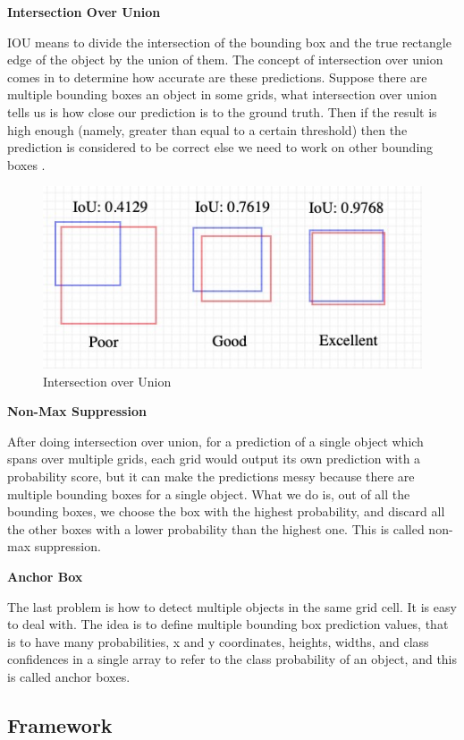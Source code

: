 \documentclass{article}
\begin{document}
\textbf{Intersection Over Union}

IOU means to divide the intersection of the bounding box and the true rectangle edge of the object by the union of them. The concept of intersection over union comes in to determine how accurate are these predictions. Suppose there are multiple bounding boxes an object in some grids, what intersection over union tells us is how close our prediction is to the ground truth. Then if the result is high enough (namely, greater than equal to a certain threshold) then the prediction is considered to be correct else we need to work on other bounding boxes \cite{ahmed2015optimizing}.

\begin{figure}[h]
\centering
\includegraphics[scale=0.5]{IoU.jpeg}
\caption{Intersection over Union}
\label{fig:IoU}
\end{figure}

\textbf{Non-Max Suppression}

After doing intersection over union, for a prediction of a single object which spans over multiple grids, each grid would output its own prediction with a probability score, but it can make the predictions messy because there are multiple bounding boxes for a single object. What we do is, out of all the bounding boxes, we choose the box with the highest probability, and discard all the other boxes with a lower probability than the highest one. This is called non-max suppression.

\textbf{Anchor Box}

The last problem is how to detect multiple objects in the same grid cell. It is easy to deal with. The idea is to define multiple bounding box prediction values, that is to have many probabilities, x and y coordinates, heights, widths, and class confidences in a single array to refer to the class probability of an object, and this is called anchor boxes. 

\subsection{Framework}
\end{document}
